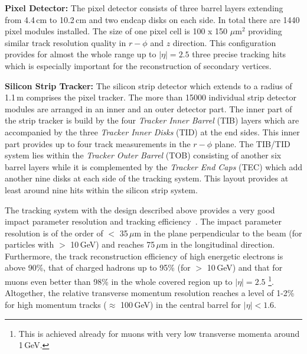 \begin{description}
 \item \textbf{Pixel Detector:} The pixel detector consists of three barrel layers extending from 4.4\,cm to 10.2\,cm and two endcap disks on each side. In total there are 1440 pixel modules installed. The size of one pixel cell is 100 x 150 $\mu \mathrm{m}^2$ providing similar track resolution quality in $r-\phi$ and $z$ direction. This configuration provides for almost the whole range up to $|\eta| = 2.5$ three precise tracking hits which is especially important for the reconstruction of secondary vertices.
 \item \textbf{Silicon Strip Tracker:} The silicon strip detector which extends to a radius of 1.1\,m comprises the pixel tracker. The more than 15000 individual strip detector modules are arranged in an inner and an outer detector part. The inner part of the strip tracker is build by the four \textit{Tracker Inner Barrel} (TIB) layers which are accompanied by the three \textit{Tracker Inner Disks} (TID) at the end sides. This inner part provides up to four track measurements in the $r-\phi$ plane. The TIB/TID system lies within the \textit{Tracker Outer Barrel} (TOB) consisting of another six barrel layers while it is complemented by the \textit{Tracker End Caps} (TEC) which add another nine disks at each side of the tracking system. This layout provides at least around nine hits within the silicon strip system. 
\end{description}
The tracking system with the design described above provides a very good impact parameter resolution and tracking efficiency~\cite{bib:cmstdr:tracker}. The impact parameter resolution is of the order of $<$ 35\,$\mu$m in the plane perpendicular to the beam (for particles with \pt $>$ 10\,GeV) and reaches 75\,$\mu$m in the longitudinal direction. Furthermore, the track reconstruction efficiency of high energetic electrons is above 90\%, that of charged hadrons up to 95\% (for \pt $>$ 10\,GeV) and that for muons even better than 98\% in the whole covered region up to $|\eta| = 2.5$ \footnote{This is achieved already for muons with very low transverse momenta around 1\,GeV.}. Altogether, the relative transverse momentum resolution reaches a level of 1-2\% for high momentum tracks ($\approx$ 100\,GeV) in the central barrel for $|\eta| < 1.6$.
 

